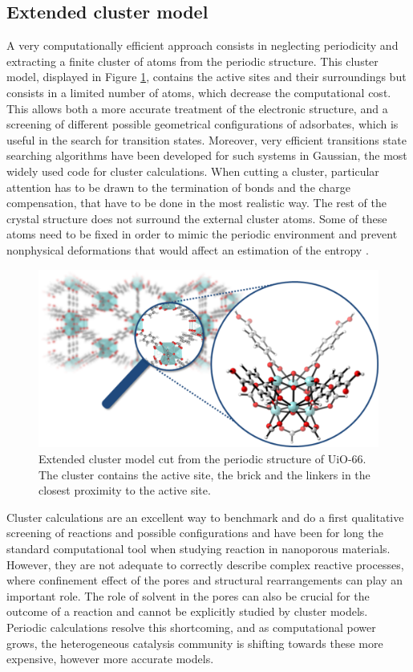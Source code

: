 \subsection*{Extended cluster model}
A very computationally efficient approach consists in neglecting periodicity and extracting a finite cluster of atoms from the periodic structure. This cluster model, displayed in Figure \ref{fig:clusterzoom}, contains the active sites and their surroundings but consists in a limited number of atoms, which decrease the computational cost. 
This allows both a more accurate treatment of the electronic structure, and a screening of different possible geometrical configurations of adsorbates, which is useful in the search for transition states. Moreover, very efficient transitions state searching algorithms have been developed for such systems in Gaussian, the most widely used code for cluster calculations.
When cutting a cluster, particular attention has to be drawn to the termination of bonds and the charge compensation, that have to be done in the most realistic way. The rest of the crystal structure does not surround the external cluster atoms. Some of these atoms need to be fixed in order to mimic the periodic environment and prevent nonphysical deformations that would affect an estimation of the entropy \cite{DeWispelaere2018}.

\begin{figure}[!htbp]
	\centering
 	\includegraphics[width=1.0\textwidth]{clusterzoom}
	\caption{Extended cluster model cut from the periodic structure of UiO-66. The cluster contains the active site, the brick and the linkers in the closest proximity to the active site.}
	\label{fig:clusterzoom}
\end{figure}

Cluster calculations are an excellent way to benchmark and do a first qualitative screening of reactions and possible configurations and have been for long the standard computational tool when studying reaction in nanoporous materials. However, they are not adequate to correctly describe complex reactive processes, where confinement effect of the pores and structural rearrangements can play an important role. The role of solvent in the pores can also be crucial for the outcome of a reaction and cannot be explicitly studied by cluster models. Periodic calculations resolve this shortcoming, and as computational power grows, the heterogeneous catalysis community is shifting towards these more expensive, however more accurate models. 

